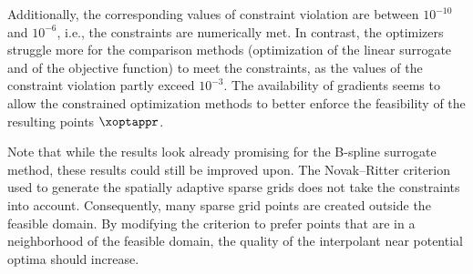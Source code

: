 Additionally, the corresponding values of constraint violation
are between $10^{-10}$ and $10^{-6}$, i.e.,
the constraints are numerically met.
In contrast, the optimizers struggle more for
the comparison methods (optimization of the linear surrogate and
of the objective function) to meet the constraints,
as the values of the constraint violation partly exceed $10^{-3}$.
The availability of gradients seems to allow the constrained optimization
methods to better enforce the feasibility of the
resulting points $\xoptappr$.

Note that while the results look already promising for the B-spline surrogate
method, these results could still be improved upon.
The Novak--Ritter criterion used to generate the
spatially adaptive sparse grids does not take the constraints into account.
Consequently, many sparse grid points are created outside the feasible domain.
By modifying the criterion to prefer points that are in a neighborhood of
the feasible domain, the quality of the interpolant near potential optima
should increase.
